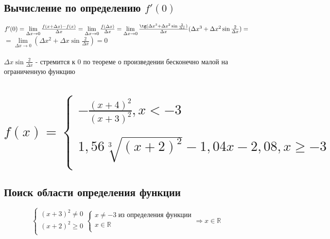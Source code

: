 \documentclass{article}
\begin{document}
    \subsection{Вычисление по определению $f'(0)$}
    $f'(0) = \lim\limits_{\Delta x \to 0} \frac{f(x + \Delta x) - f(x)}{\Delta x} = \lim\limits_{\Delta x \to 0} \frac{f(\Delta x)}{\Delta x} = \lim\limits_{\Delta x \to 0} \frac{\tg (\Delta x^3 + \Delta x^2 \sin \frac{2}{\Delta x})}{\Delta x} (\Delta x^3 + \Delta x^2 \sin \frac{2}{\Delta x}) =$ \\
    $= \lim\limits_{\Delta x \to 0} (\Delta x^2 + \Delta x \sin \frac{2}{\Delta x}) = 0$ \\ \\
    $\Delta x \sin \frac{2}{\Delta x}$ - стремится к 0 по теореме о произведении бесконечно малой на ограниченную функцию

    
\newpage
\section{
\begin{equation*}
f(x) = 
\begin{cases}
    - \frac{(x+4)^2}{(x+3)^2}, x < -3 \\ \\ 
    1,56 \sqrt[3]{(x+2)^2} - 1,04 x - 2,08, x \geq -3 \\
\end{cases}
\end{equation*}
}
    \subsection{Поиск области определения функции}
    \begin{equation*} 
    \begin{cases}
        (x+3)^2 \neq 0 \\ 
        (x+2)^2 \geq 0 \\
    \end{cases}
    \begin{cases}
        x \neq -3 \; \text{из определения функции} \\ 
        x \in \mathbb{R} \\
    \end{cases}
    \Rightarrow
    x \in \mathbb{R}
    \end{equation*}
    
\end{document}
